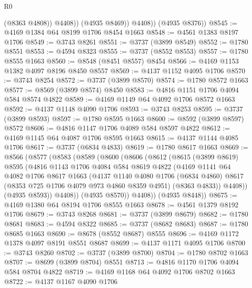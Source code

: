 \begin{lexlean}{R0}
\begin{coremodule}
                  (@8363 @4808))
                @4408))
            (@4935 @8469))
          @4408))
      (@4935 @8376))
@8545 := @4169 @1384 @64 @8199 @1706 @8454 @1663
@8548 := @4561 @1383 @8197 @1706
@8549 := @3743 @8261
@8551 := @3737 (@3899 @8549)
@8552 := @1780 @8551
@8553 := @4594 @8323
@8555 := @3737 (@8552 @8553)
@8557 := @1780 @8555 @1663
@8560 := @8548 (@8451 @8557) @8454
@8566 := @4169 @1153 @1382 @4097 @8196 @8450 @8557
@8569 := @4137 @1152 @4095 @1706
@8570 := @3743 @8254
@8572 := @3737 (@3899 @8570)
@8574 := @1780 @8572 @1663
@8577 := @8569 (@3899 @8574) @8450
@8583 := @4816 @1151 @1706 @4094 @584 @8574 @4822
@8589 := @4169 @1149 @64 @4092 @1706 @8572 @1663
@8592 := @4137 @1148 @4090 @1706
@8593 := @3743 @8253
@8595 := @3737 (@3899 @8593)
@8597 := @1780 @8595 @1663
@8600 := @8592 (@3899 @8597) @8572
@8606 := @4816 @1147 @1706 @4089 @584 @8597 @4822
@8612 := @4169 @1145 @64 @4087 @1706 @8595 @1663
@8615 := @4137 @1144 @4085 @1706
@8617 := @3737 (@6834 @4833)
@8619 := @1780 @8617 @1663
@8669 := @8566
    (@8577
      (@8583
        (@8589
          (@8600
            (@8606
              (@8612
                (@8615
                  (@3899 @8619)
                  @8595
                  (@4816
                    @1143
                    @1706
                    @4084
                    @584
                    @8619
                    @4822
                    (@4169
                      @1141
                      @64
                      @4082
                      @1706
                      @8617
                      @1663
                      (@4137
                        @1140
                        @4080
                        @1706
                        (@6834 @4860)
                        @8617
                        (@8353 @725 @1706 @4079 @973 @4860 @8359 @4951)
                        (@8363 @4833))
                      @4408))
                  (@4935 @8593))
                @4408))
            (@4935 @8570))
          @4408))
      (@4935 @8448))
@8675 := @4169 @1380 @64 @8194 @1706 @8555 @1663
@8678 := @4561 @1379 @8192 @1706
@8679 := @3743 @8268
@8681 := @3737 (@3899 @8679)
@8682 := @1780 @8681
@8683 := @4594 @8322
@8685 := @3737 (@8682 @8683)
@8687 := @1780 @8685 @1663
@8690 := @8678 (@8552 @8687) @8555
@8696 := @4169 @1172 @1378 @4097 @8191 @8551 @8687
@8699 := @4137 @1171 @4095 @1706
@8700 := @3743 @8260
@8702 := @3737 (@3899 @8700)
@8704 := @1780 @8702 @1663
@8707 := @8699 (@3899 @8704) @8551
@8713 := @4816 @1170 @1706 @4094 @584 @8704 @4822
@8719 := @4169 @1168 @64 @4092 @1706 @8702 @1663
@8722 := @4137 @1167 @4090 @1706

\end{coremodule}
\end{lexlean}
